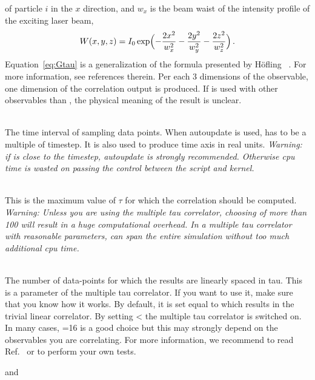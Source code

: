 \begin{arguments}
\begin{itemize}
    of particle $i$ in the $x$ direction, and $w_x$ is the beam waist of the intensity profile 
    of the exciting laser beam,
    \begin{equation}
    W(x,y,z) = I_0 \exp \Bigl( - \frac{2x^2}{w_x^2} - \frac{2y^2}{w_y^2} - \frac{2z^2}{w_z^2} \Bigr)\,.
    \end{equation}
    Equation~\ref{eq:Gtau} is a generalization of the formula presented by 
    H\"ofling \etal~\cite{hofling11a}. For more information, see references therein.
    Per each 3 dimensions of the observable, one dimension of the correlation output
    is produced. If  is used with other observables than 
    , the physical meaning of the result is unclear.
  \end{itemize}
\item {} \\
  The time interval of sampling data points. When autoupdate is used,  has
  to be a multiple of timestep. It is also used to produce time axis in real units.
  \textit{Warning: if  is close to the timestep, autoupdate is strongly recommended.
  Otherwise cpu time is wasted on passing the control between the script and kernel.}
\item {} \\
  This is the maximum value of $\tau$ for which the correlation should be computed.
  \textit{Warning: Unless you are using the multiple tau correlator, choosing 
  of more than 100 will result in a huge computational overhead.
  In a multiple tau correlator with reasonable parameters, 
   can span the entire simulation without
  too much additional cpu time.}
\item {} \\
  The number of data-points for which the results are linearly spaced
  in tau.  This is a parameter of the multiple tau correlator. If you
  want to use it, make sure that you know how it works. By default, it
  is set equal to  which results in the trivial linear
  correlator. By setting  <  the multiple
  tau correlator is switched on. In many cases, =16 is a
  good choice but this may strongly depend on the observables you are
  correlating.  For more information, we recommend to read
  Ref.~\cite{ramirez10a} or to perform your own tests.
\item {} and  \\

\end{arguments}
